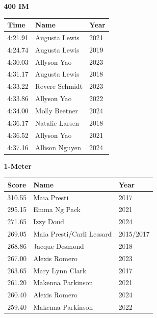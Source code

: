 \vspace{1.2em}
\noindent\begin{minipage}[t]{0.48\textwidth}
\centering
\textbf{\textcolor{teamprimary}{400 IM}}\par
\vspace{0.5em}
\centering
\small
\renewcommand{\arraystretch}{1.0}
\setlength{\tabcolsep}{4pt}
\begin{tabular}{@{}p{1.8cm}p{3.0cm}p{1.0cm}@{}}
\toprule
\textbf{Time} & \textbf{Name} & \textbf{Year} \\
\midrule
4:21.91 & Augusta Lewis & 2021 \\
4:24.74 & Augusta Lewis & 2019 \\
4:30.03 & Allyson Yao & 2023 \\
4:31.17 & Augusta Lewis & 2018 \\
4:33.22 & Revere Schmidt & 2023 \\
4:33.86 & Allyson Yao & 2022 \\
4:34.00 & Molly Beetner & 2024 \\
4:36.17 & Natalie Larsen & 2018 \\
4:36.52 & Allyson Yao & 2021 \\
4:37.16 & Allison Nguyen & 2024 \\
\bottomrule
\end{tabular}
\end{minipage}
\hfill
\begin{minipage}[t]{0.48\textwidth}
\centering
\textbf{\textcolor{teamprimary}{1-Meter}}\par
\vspace{0.5em}
\centering
\small
\renewcommand{\arraystretch}{1.0}
\setlength{\tabcolsep}{4pt}
\begin{tabular}{@{}p{1.8cm}p{3.0cm}p{1.0cm}@{}}
\toprule
\textbf{Score} & \textbf{Name} & \textbf{Year} \\
\midrule
310.55 & Maia Presti & 2017 \\
295.15 & Emma Ng Pack & 2021 \\
271.65 & Izzy Doud & 2024 \\
269.05 & Maia Presti/Carli Lessard & 2015/2017 \\
268.86 & Jacque Desmond & 2018 \\
267.00 & Alexis Romero & 2023 \\
263.65 & Mary Lynn Clark & 2017 \\
261.20 & Makenna Parkinson & 2021 \\
260.40 & Alexis Romero & 2024 \\
259.40 & Makenna Parkinson & 2022 \\
\bottomrule
\end{tabular}
\end{minipage}

